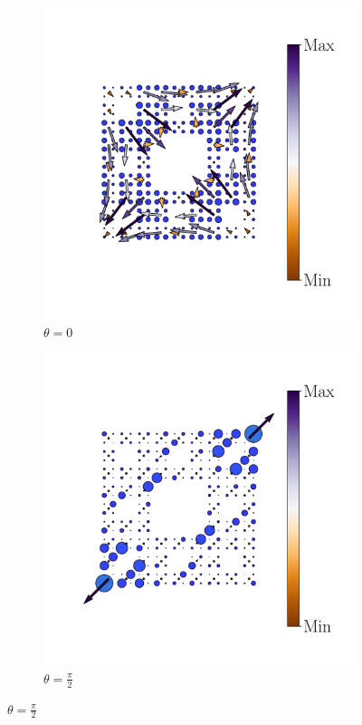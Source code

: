 \begin{figure}[h!]
\begin{minipage}[h!]{1.1\textwidth}
\begin{subfigure}[b!]{0.2 \textwidth}
         \end{subfigure}\hspace*{-0.5em}
          \begin{subfigure}[b!]{0.2 \textwidth}
             \caption*{$\theta = 0$}
             \includegraphics[width=\textwidth]{Imagenes/Resultados_pump_Fractal/xy/hoti_pomp_xy_pos3.pdf}
         \end{subfigure}\hspace*{-0.5em}
          \begin{subfigure}[b!]{0.2 \textwidth}
             \caption*{$\theta = \frac{\pi}{2}$}
             \includegraphics[width=\textwidth]{Imagenes/Resultados_pump_Fractal/xy/hoti_pomp_xy_pos4.pdf}

\end{subfigure}
\end{minipage}
\end{figure}
